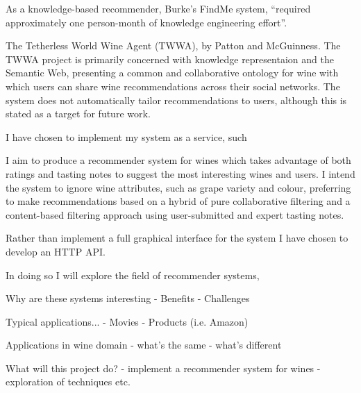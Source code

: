As a knowledge-based recommender, Burke's FindMe system, ``required approximately one person-month of knowledge engineering effort''\cite{Burke99b}.

The Tetherless World Wine Agent (TWWA), by Patton and McGuinness\cite{Patton}. The TWWA project is primarily concerned with knowledge representaion and the Semantic Web, presenting a common and collaborative ontology for wine with which users can share wine recommendations across their social networks\cite{TWWAIndex}. The system does not automatically tailor recommendations to users, although this is stated as a target for future work\cite{TWWAIndex}.


I have chosen to implement my system as a service, such 


I aim to produce a recommender system for wines which takes advantage of both ratings and tasting notes to suggest the most interesting wines and users. I intend the system to ignore wine attributes, such as grape variety and colour, preferring to make recommendations based on a hybrid of pure collaborative filtering and a content-based filtering approach using user-submitted and expert tasting notes.

Rather than implement a full graphical interface for the system I have chosen to develop an HTTP API.

In doing so I will explore the field of recommender systems, 

Why are these systems interesting - Benefits - Challenges

Typical applications...  - Movies - Products (i.e. Amazon)

Applications in wine domain - what's the same - what's different

What will this project do?  - implement a recommender system for wines -
exploration of techniques etc.

